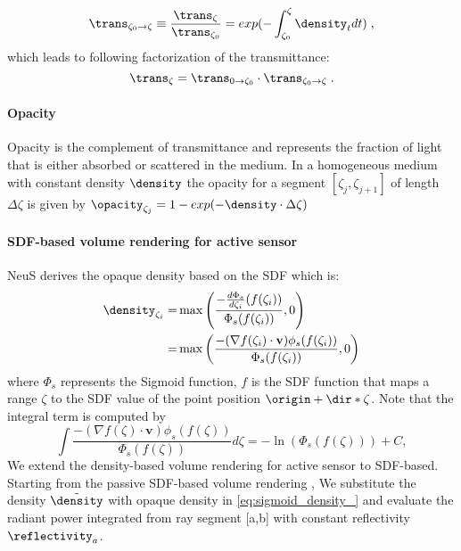 \begin{equation}
\trans_{\zeta_0 \rightarrow \zeta} \equiv \frac{\trans_{\zeta}}{\trans_{\zeta_0}} = exp({-\int_{\zeta_0}^\zeta \density_t dt})\;,
\label{eq:trans_ab}
\end{equation}
which leads to following factorization of the transmittance:
\begin{equation}
\trans_{\zeta} = \trans_{0 \rightarrow \zeta_0} \cdot \trans_{\zeta_0 \rightarrow \zeta}\;.
\label{eq:factor}
\end{equation}

\paragraph{Opacity}
Opacity is the complement of transmittance and represents the fraction of light that is either absorbed or scattered in the medium. In a homogeneous medium with constant density $\density$  the opacity for a segment $[\zeta_j, \zeta_{j+1}]$ of length $\Delta \zeta$ is given by $\opacity_{\zeta_j} = 1 - exp(-\density \cdot \Delta \zeta)$

\paragraph{SDF-based volume rendering for active sensor}
NeuS\cite{wang2021neus} derives the opaque density based on the SDF which is:
\begin{equation}
\begin{split}
\density_{\zeta_i} =&  \max\left(\frac{-\frac{d\Phi_s}{d\zeta_i}(f(\zeta_i))}{\Phi_s(f(\zeta_i))},0\right)\\
                  =& \max\left(\frac{-(\nabla f(\zeta_i)\cdot \mathbf{v})\phi_s(f(\zeta_i))}{\Phi_s(f(\zeta_i))}, 0\right)
\end{split}
\label{eq:sigmoid_density_}
\end{equation}
where $\Phi_s$ represents the Sigmoid function, $f$ is the SDF function that maps a range $\zeta$ to the SDF value of the point position $\origin + \dir * \zeta$. Note that the integral term is computed by
\begin{equation}
\int \frac{-(\nabla f(\zeta)\cdot \mathbf{v})\phi_s(f(\zeta))}{\Phi_s(f(\zeta))}d\zeta = -\ln(\Phi_s(f(\zeta))) + C,
\label{eq:intergration_density}
\end{equation}
We extend the density-based volume rendering for active sensor to SDF-based. Starting from the passive SDF-based volume rendering \cite{wang2021neus}, We substitute the density $\tilde{\density}$ with opaque density in \ref{eq:sigmoid_density_}
and evaluate the radiant power integrated from ray segment [a,b] with constant reflectivity $\reflectivity_a$.

